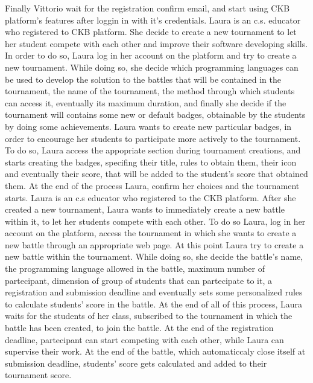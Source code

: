 \documentclass{article}
\newcounter{subsubsubsection}[subsubsection]
\begin{document}
{Finally Vittorio wait for the registration confirm email, and start using CKB platform's features after loggin in with it's credentials.
Laura is an c.s. educator who registered to CKB platform. She decide to create a new tournament to let her student compete with each other and improve their software developing skills. In order to do so, Laura log in her account on the platform and try to create a new tournament. While doing so, she decide which programming languages can be used to develop the solution to the battles that will be contained in the tournament, the name of the tournament, the method through which students can access it, eventually its maximum duration, and finally she decide if the tournament will contains some new or default badges, obtainable by the students by doing some achievements.
Laura wants to create new particular badges, in order to encourage her students to participate more actively to the tournament. To do so, Laura access the appopriate section during tournament creations, and starts creating the badges, specifing their title, rules to obtain them, their icon and eventually their score, that will be added to the student's score that obtained them.
At the end of the process Laura, confirm her choices and the tournament starts.
Laura is an c.s educator who registered to the CKB platform. After she created a new tournament, Laura wants to immediately create a new battle within it, to let her students compete with each other. To do so Laura, log in her account on the platform, access the tournament in which she wants to create a new battle through an appropriate web page. At this point Laura try to create a new battle within the tournament. While doing so, she decide the battle's name, the programming language allowed in the battle, maximum number of partecipant, dimension of group of students that can partecipate to it, a registration and submission deadline and eventually sets some personalized rules to calculate students' score in the battle.
At the end of all of this process, Laura waits for the students of her class, subscribed to the tournament in which the battle has been created, to join the battle. At the end of the registration deadline, partecipant can start competing with each other, while Laura can supervise their work.
At the end of the battle, which automaticcaly close itself at submission deadline, students' score gets calculated and added to their tournament score.
}
\end{document}
